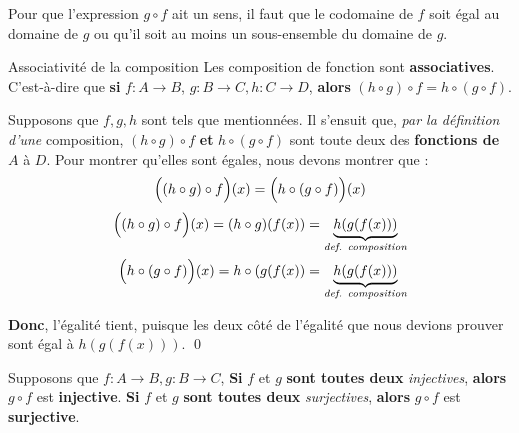 \documentclass[16pt]{report}
\begin{document}
\begin{multicols*}{2}
            \begin{note}{}{}
                Pour que l'expression $g\circ f$ ait un sens, il faut que le codomaine de $f$ soit égal 
                au domaine de $g$ ou qu'il soit au moins un sous-ensemble du domaine de $g$. 
            \end{note}
            \pagebreak


            \begin{Theorem}{Associativité de la composition}
                Les composition de fonction sont \textbf{associatives}. C'est-à-dire que 
                \textbf{si} $f : A \rightarrow  B$, 
                $g : B \rightarrow  C, h : C \rightarrow  D$, \textbf{alors} $(h \circ g)\circ f = 
                h \circ (g \circ f)$. 
            \end{Theorem}


            \begin{Preuve}{}{}
                Supposons que $f, g, h$ sont tels que mentionnées. Il s'ensuit que, \textit{par la définition d'une} 
                composition, $(h \circ g)\circ f$ \textbf{et} $h \circ (g \circ f)$ sont toute deux 
                des \textbf{fonctions de} $A$ à $D$. Pour montrer qu'elles sont égales, nous devons montrer que :
                        \[ \Bigl( (h \circ g)\circ f\Bigr)(x) = \Bigl( h\circ(g\circ f)\Bigr)(x) \]
                \begin{align*}
                    \Bigl( (h \circ g)\circ f\Bigr)(x) = (h\circ g)(f(x)) = 
                    \underbrace{h(g(f(x)))}_{\textit{def. composition}}  
                    \\ 
                    \Bigl( h \circ (g\circ f)\Bigr)(x) = h\circ (g(f(x)) = 
                    \underbrace{h(g(f(x)))}_{\textit{def. composition}}  
                \end{align*}

                \textbf{Donc}, l'égalité tient, puisque les deux côté de l'égalité que nous devions 
                prouver sont égal à  $h(g(f(x)))$. \qed
            \end{Preuve}                


            
            \begin{Theorem}{}{}
                Supposons que $f : A \rightarrow B, g : B \rightarrow C$, \textbf{Si} $f$ et $g$ 
                \textbf{sont toutes deux} \textit{injectives}, \textbf{alors} $g \circ f$ est \textbf{injective}. 
                \textbf{Si} $f$ et $g$ \textbf{sont toutes deux} 
                \textit{surjectives}, \textbf{alors} $g \circ f$ est \textbf{surjective}. 
            \end{Theorem}



\end{multicols*}
\end{document}
